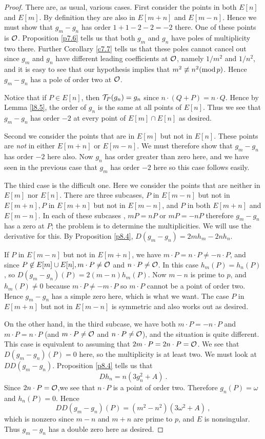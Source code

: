 \begin{proof} 
There are, as usual, various cases. First consider the points in both $E[n]$ and $E[m]$. By definition they are also in $E[m+n]$ and $E[m-n]$. Hence we must show that $g_{m}-g_{n}$ has order $1+1-2-2=-2$ there. One of these points is $\mathcal{O}$. Proposition \ref{p7.6} tells us that both $g_{m}$ and $g_{n}$ have poles of multiplicity two there. Further Corollary \ref{c7.7} tells us that these poles cannot cancel out since $g_{m}$ and $g_{n}$ have different leading coefficients at $\mathcal{O}$, namely $1/m^{2}$ and $1/n^{2}$, and it is easy to see that our hypothesis implies that $m^{2}\not\equiv n^{2}(\operatorname{mod} p)$. Hence $g_{m}-g_{n}$ has a pole of order two at $\mathcal{O}$.

Notice that if $P\in E[n]$, then $\mathcal{T}_{P}(g_{n})=g_{n}$ since $n\cdot(Q+P)=n\cdot Q$. Hence by Lemma \ref{l8.5}, the order of $g_{n}$ is the same at all points of $E[n]$. Thus we see that $g_{m}-g_{n}$ has order $-2$ at every point of $E[m]\cap E[n]$ as desired.

Second we consider the points that are in $E[m]$ but not in $E[n]$. These points are {\it not} in either $E[m+n]$ or $E[m-n]$. We must therefore show that $g_{m}-g_{n}$ has order $-2$ here also. Now $g_{n}$ has order greater than zero here, and we have seen in the previous case that $g_{m}$ has order $-2$ here so this case follows easily.

The third case is the difficult one. Here we consider the points that are neither in $E[m]$ nor $E[n]$. There are three subcases, $P$ in $E[m-n]$ but not in $E[m+n],P$ in $E[m+n]$ but not in $E[m-n]$, and $P$ in both $E[m+n]$ and $E[m-n]$. In each of these subcases , $mP=nP$ or $mP=-nP$ therefore $g_{m}-g_{n}$ has a zero at $P$; the problem is to determine the multiplicities. We will use the derivative for this. By Proposition \ref{p8.4}, $D(g_{m}-g_{n})=2mh_{m}-2nh_{n}$.

If $P$ in $E[m-n]$ but not in $E[m+n]$, we have $m\cdot P=n\cdot P\neq-n\cdot P$, and since $P\not\in E[m]\cup E[n],m\cdot P\neq \mathcal{O}$ and $n\cdot P\neq \mathcal{O}$. In this case $h_{m}(P)=h_{n}(P)$, so $D(g_{m}-g_{n})(P)=2(m-n)h_{m}(P)$. Now $m-n$ is prime to $p$, and $h_{m}(P)\neq 0$ because $m\cdot P\neq-m\cdot P$ so $m\cdot P$ cannot be a point of order two. Hence $g_{m}-g_{n}$ has a simple zero here, which is what we want. The case $P$ in $E[m+n]$ but not in $E[m-n]$ is symmetric and also works out as desired.

On the other hand, in the third subcase, we have both $m\cdot P=-n\cdot P$ and $m\cdot P=n\cdot P$ (and $m\cdot P\neq \mathcal{O}$ and $n\cdot P\neq \mathcal{O}$), and the situation is quite different. This case is equivalent to assuming that $2m\cdot P=2n\cdot P=\mathcal{O}$. We see that $D(g_{m}-g_{n})(P)=0$ here, so the multiplicity is at least two. We must look at $DD(g_{m}-g_{n})$. Proposition \ref{p8.4} tells us that
$$
Dh_{n}=n(3g_{n}^2+A)\ .
$$
Since $2n\cdot P=\mathcal{O}$,we see that $n\cdot P$ is a point of order two. Therefore $ g_{n}(P)=\omega$ and $h_{n}(P)=0$. Hence
$$
DD(g_{m}-g_{n})(P)=(m^{2}-n^{2})(3\omega^{2}+A)\ ,
$$
which is nonzero since $m-n$ and $m+n$ are prime to $p$, and $E$ is nonsingular. Thus $g_{m}-g_{n}$ has a double zero here as desired.
\end{proof}

